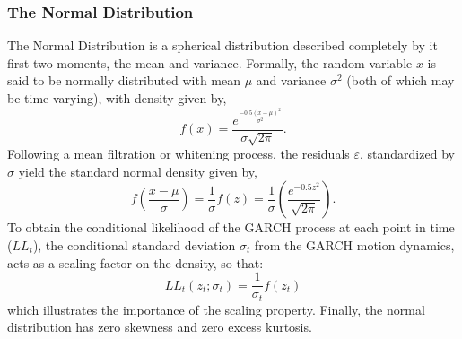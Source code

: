 \subsubsection{The Normal Distribution}\label{normdist}
The Normal Distribution is a spherical distribution described completely by it
first two moments, the mean and variance. Formally, the random variable $x$ is
said to be normally distributed with mean $\mu$ and variance $\sigma^2$
(both of which may be time varying), with density given by,
\begin{equation}\label{eq:dnorm1}
f\left( x \right) = \frac{{{e^{\frac{{ - 0.5{{\left( {x - \mu } \right)}^2}}}
{{{\sigma ^2}}}}}}}
{{\sigma \sqrt {2\pi } }}.
\end{equation}
Following a mean filtration or whitening process, the residuals $\varepsilon$,
standardized by $\sigma$ yield the standard normal density given by,
\begin{equation}\label{eq:dnorm2}
f\left( {\frac{{x - \mu }}{\sigma }} \right) = \frac{1}
{\sigma }f\left( z \right) = \frac{1}
{\sigma }\left( {\frac{{{e^{ - 0.5{z^2}}}}}
{{\sqrt {2\pi } }}} \right).
\end{equation}
To obtain the conditional likelihood of the GARCH process at each point in time
($LL_t$), the conditional standard deviation $\sigma_t$ from the GARCH motion
dynamics, acts as a scaling factor on the density, so that:
\begin{equation}\label{eq:dnorm3}
L{L_t}\left( {{z_t};{\sigma _t}} \right) = \frac{1}
{{{\sigma _t}}}f\left( {{z_t}} \right)
\end{equation}
which illustrates the importance of the scaling property. Finally, the normal
distribution has zero skewness and zero excess kurtosis.


